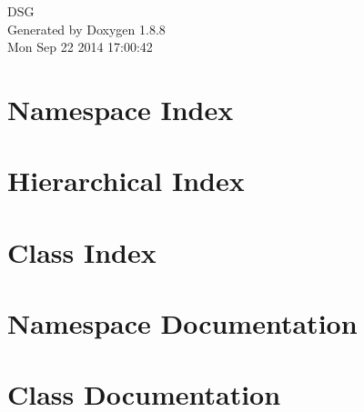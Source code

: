\documentclass[twoside]{book}
\newcommand{\+}{\discretionary{\mbox{\scriptsize$\hookleftarrow$}}{}{}}
\newcommand{\clearemptydoublepage}{%
  \newpage{\pagestyle{empty}\cleardoublepage}%
}
\begin{document}
\hypersetup{pageanchor=false,
             bookmarks=true,
             bookmarksnumbered=true,
             pdfencoding=unicode
            }
\begin{titlepage}
\vspace*{7cm}
\begin{center}%
{\Large D\+S\+G }\\
\vspace*{1cm}
{\large Generated by Doxygen 1.8.8}\\
\vspace*{0.5cm}
{\small Mon Sep 22 2014 17:00:42}\\
\end{center}
\end{titlepage}
\clearemptydoublepage
\tableofcontents
\clearemptydoublepage
{}
\hypersetup{pageanchor=true}

\chapter{Namespace Index}

\chapter{Hierarchical Index}

\chapter{Class Index}

\chapter{Namespace Documentation}



\chapter{Class Documentation}


















\newpage
{}
{}
\printindex
\end{document}
